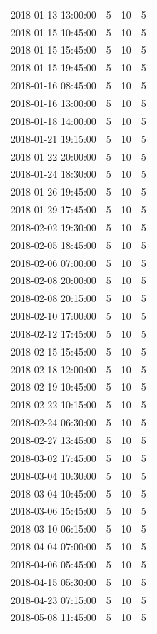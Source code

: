 \begin{tabular}{lrrr}
2018-01-13 13:00:00 & 5 & 10 & 5 \\
2018-01-15 10:45:00 & 5 & 10 & 5 \\
2018-01-15 15:45:00 & 5 & 10 & 5 \\
2018-01-15 19:45:00 & 5 & 10 & 5 \\
2018-01-16 08:45:00 & 5 & 10 & 5 \\
2018-01-16 13:00:00 & 5 & 10 & 5 \\
2018-01-18 14:00:00 & 5 & 10 & 5 \\
2018-01-21 19:15:00 & 5 & 10 & 5 \\
2018-01-22 20:00:00 & 5 & 10 & 5 \\
2018-01-24 18:30:00 & 5 & 10 & 5 \\
2018-01-26 19:45:00 & 5 & 10 & 5 \\
2018-01-29 17:45:00 & 5 & 10 & 5 \\
2018-02-02 19:30:00 & 5 & 10 & 5 \\
2018-02-05 18:45:00 & 5 & 10 & 5 \\
2018-02-06 07:00:00 & 5 & 10 & 5 \\
2018-02-08 20:00:00 & 5 & 10 & 5 \\
2018-02-08 20:15:00 & 5 & 10 & 5 \\
2018-02-10 17:00:00 & 5 & 10 & 5 \\
2018-02-12 17:45:00 & 5 & 10 & 5 \\
2018-02-15 15:45:00 & 5 & 10 & 5 \\
2018-02-18 12:00:00 & 5 & 10 & 5 \\
2018-02-19 10:45:00 & 5 & 10 & 5 \\
2018-02-22 10:15:00 & 5 & 10 & 5 \\
2018-02-24 06:30:00 & 5 & 10 & 5 \\
2018-02-27 13:45:00 & 5 & 10 & 5 \\
2018-03-02 17:45:00 & 5 & 10 & 5 \\
2018-03-04 10:30:00 & 5 & 10 & 5 \\
2018-03-04 10:45:00 & 5 & 10 & 5 \\
2018-03-06 15:45:00 & 5 & 10 & 5 \\
2018-03-10 06:15:00 & 5 & 10 & 5 \\
2018-04-04 07:00:00 & 5 & 10 & 5 \\
2018-04-06 05:45:00 & 5 & 10 & 5 \\
2018-04-15 05:30:00 & 5 & 10 & 5 \\
2018-04-23 07:15:00 & 5 & 10 & 5 \\
2018-05-08 11:45:00 & 5 & 10 & 5 \\

\end{tabular}
